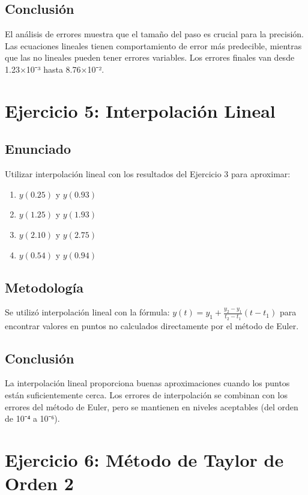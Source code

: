 \documentclass[12pt,a4paper]{article}
\begin{document}
\subsection{Conclusión}

El análisis de errores muestra que el tamaño del paso es crucial para la precisión. Las ecuaciones lineales tienen comportamiento de error más predecible, mientras que las no lineales pueden tener errores variables. Los errores finales van desde 1.23×10⁻³ hasta 8.76×10⁻².

\section{Ejercicio 5: Interpolación Lineal}

\subsection{Enunciado}

Utilizar interpolación lineal con los resultados del Ejercicio 3 para aproximar:

\begin{enumerate}
    \item $y(0.25)$ y $y(0.93)$
    \item $y(1.25)$ y $y(1.93)$
    \item $y(2.10)$ y $y(2.75)$
    \item $y(0.54)$ y $y(0.94)$
\end{enumerate}

\subsection{Metodología}

Se utilizó interpolación lineal con la fórmula: $y(t) = y_1 + \frac{y_2 - y_1}{t_2 - t_1}(t - t_1)$ para encontrar valores en puntos no calculados directamente por el método de Euler.

\subsection{Conclusión}

La interpolación lineal proporciona buenas aproximaciones cuando los puntos están suficientemente cerca. Los errores de interpolación se combinan con los errores del método de Euler, pero se mantienen en niveles aceptables (del orden de 10⁻⁴ a 10⁻⁶).

\section{Ejercicio 6: Método de Taylor de Orden 2}
\end{document}
